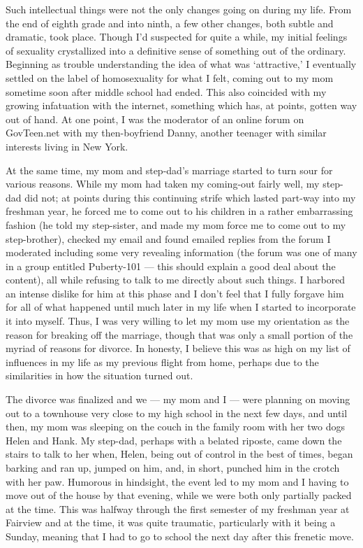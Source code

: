 \documentclass{book}
\begin{document}
Such intellectual things were not the only changes going on during my life.  From the end of eighth grade and into ninth, a few other changes, both subtle and dramatic, took place.  Though I'd suspected for quite a while, my initial feelings of sexuality crystallized into a definitive sense of something out of the ordinary.  Beginning as trouble understanding the idea of what was `attractive,' I eventually settled on the label of homosexuality for what I felt, coming out to my mom sometime soon after middle school had ended.  This also coincided with my growing infatuation with the internet, something which has, at points, gotten way out of hand.  At one point, I was the moderator of an online forum on GovTeen.net with my then-boyfriend Danny, another teenager with similar interests living in New York.

At the same time, my mom and step-dad's marriage started to turn sour for various reasons.  While my mom had taken my coming-out fairly well, my step-dad did not; at points during this continuing strife which lasted part-way into my freshman year, he forced me to come out to his children in a rather embarrassing fashion (he told my step-sister, and made my mom force me to come out to my step-brother), checked my email and found emailed replies from the forum I moderated including some very revealing information (the forum was one of many in a group entitled Puberty-101 --- this should explain a good deal about the content), all while refusing to talk to me directly about such things.  I harbored an intense dislike for him at this phase and I don't feel that I fully forgave him for all of what happened until much later in my life when I started to incorporate it into myself.  Thus, I was very willing to let my mom use my orientation as the reason for breaking off the marriage, though that was only a small portion of the myriad of reasons for divorce.  In honesty, I believe this was as high on my list of influences in my life as my previous flight from home, perhaps due to the similarities in how the situation turned out.

The divorce was finalized and we --- my mom and I --- were planning on moving out to a townhouse very close to my high school in the next few days, and until then, my mom was sleeping on the couch in the family room with her two dogs Helen and Hank.  My step-dad, perhaps with a belated riposte, came down the stairs to talk to her when, Helen, being out of control in the best of times, began barking and ran up, jumped on him, and, in short, punched him in the crotch with her paw.  Humorous in hindsight, the event led to my mom and I having to move out of the house by that evening, while we were both only partially packed at the time.  This was halfway through the first semester of my freshman year at Fairview and at the time, it was quite traumatic, particularly with it being a Sunday, meaning that I had to go to school the next day after this frenetic move.
\end{document}
